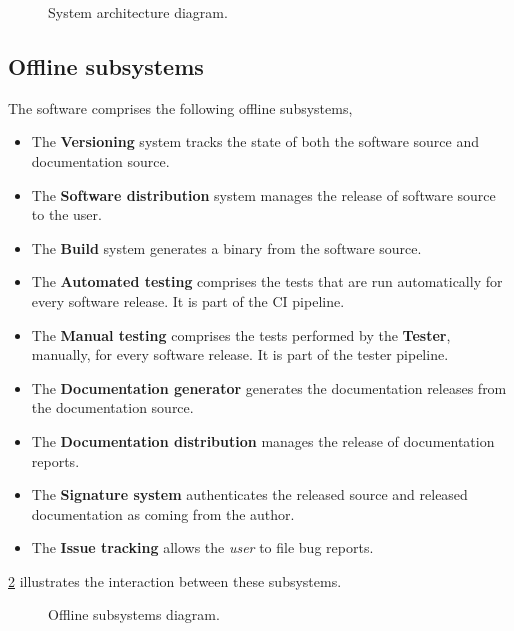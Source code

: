 \begin{figure}
  
  \caption{\label{fig:arch-diagram} System architecture diagram.}
\end{figure}

\subsection{Offline subsystems}
The software comprises the following offline subsystems,
\begin{itemize}
\item The \textbf{Versioning} system tracks the state of both the software
  source and documentation source.
\item The \textbf{Software distribution} system manages the release of
  software source to the user.
\item The \textbf{Build} system generates a binary from the software source.
\item The \textbf{Automated testing} comprises the tests that are run
  automatically for every software release. It is part of the \gls{CI} pipeline.
\item The \textbf{Manual testing} comprises the tests performed by the
  \textbf{Tester}, manually, for every software release. It is part of the
  tester pipeline.
\item The \textbf{Documentation generator} generates the documentation
  releases from the documentation source.
\item The \textbf{Documentation distribution} manages the release of
  documentation reports.
\item The \textbf{Signature system} authenticates the released source and
  released documentation as coming from the author.
\item The \textbf{Issue tracking} allows the \emph{user} to file bug reports.
\end{itemize}

\cref{fig:offline-diagram} illustrates the interaction between these subsystems.

\begin{figure}
  
  \caption{\label{fig:offline-diagram} Offline subsystems diagram.}
\end{figure}


